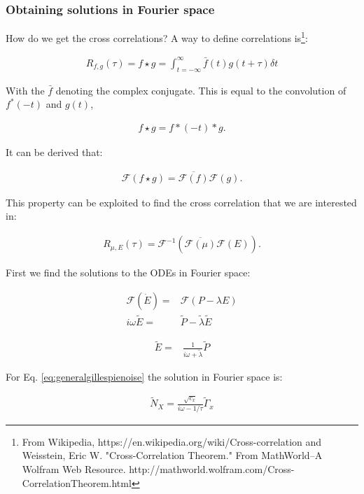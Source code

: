 \subsubsection*{Obtaining solutions in Fourier space}

How do we get the cross correlations? A way to define correlations is\footnote{From Wikipedia, https://en.wikipedia.org/wiki/Cross-correlation and Weisstein, Eric W. "Cross-Correlation Theorem." From MathWorld--A Wolfram Web Resource. http://mathworld.wolfram.com/Cross-CorrelationTheorem.html}:

\begin{align}
R_{f,g}(\tau) = f \star g = \int_{t=-\infty}^{\infty} {\bar f(t) g(t+\tau) \delta t}
\end{align}

With the $\bar{f}$ denoting the complex conjugate. This is equal to the convolution of $f^*(-t)$ and $g(t)$, 

\begin{align}
f \star g = f*(-t) * g
.
\end{align}

It can be derived that:

\begin{align}
\mathcal{F} (f \star g) = \overline{\mathcal{F} (f)} \mathcal{F}(g)
.
\end{align}

This property can be exploited to find the cross correlation that we are interested in:

\begin{align}
R_{\mu,E}(\tau) = \mathcal{F}^{-1} \left( \overline{\mathcal{F} (\mu)} \mathcal{F}(E) \right)
.
\end{align}

First we find the solutions to the ODEs in Fourier space:

\begin{align}
\label{ODEEFourier}
\mathcal{F} \left( \dot{E} \right) = & \mathcal{F} \left( P - \lambda E \right) \nonumber \\
%
i\omega \tilde{E} = & \tilde{P} - \tilde{\lambda} \tilde{E}
\end{align}

\begin{align}
 \tilde{E} = & \frac{1}{i\omega+\tilde{\lambda}} \tilde{P} 
\end{align}

For Eq. \ref{eq:generalgillespienoise} the solution in Fourier space is:

\begin{align}
\tilde{N}_X = \frac{\sqrt{c_x}}{i\omega - 1/\tau} \tilde{\Gamma}_x
\end{align}

